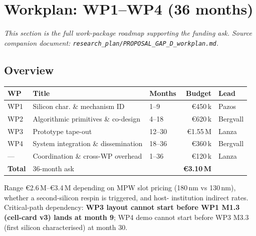 
\section{Workplan: WP1--WP4 (36 months)}
\label{sec:workplan}

\emph{This section is the full work-package roadmap supporting the
funding ask. Source companion document:
\texttt{research\_plan/PROPOSAL\_GAP\_D\_workplan.md}.}

\subsection*{Overview}

\begin{tabular}{@{}lllrl@{}}
\hline
\textbf{WP} & \textbf{Title} & \textbf{Months} & \textbf{Budget} & \textbf{Lead} \\
\hline
WP1 & Silicon char. \& mechanism ID & 1--9 & \euro 450\,k & Pazos \\
WP2 & Algorithmic primitives \& co-design & 4--18 & \euro 620\,k & Bergvall \\
WP3 & Prototype tape-out & 12--30 & \euro 1.55\,M & Lanza \\
WP4 & System integration \& dissemination & 18--36 & \euro 360\,k & Bergvall \\
--- & Coordination \& cross-WP overhead & 1--36 & \euro 120\,k & Lanza \\
\hline
\textbf{Total} & 36-month ask & & \textbf{\euro 3.10\,M} & \\
\hline
\end{tabular}

\vspace{4pt}
Range \euro 2.6\,M--\euro 3.4\,M depending on MPW slot pricing (180\,nm
vs 130\,nm), whether a second-silicon respin is triggered, and host-
institution indirect rates. Critical-path dependency: \textbf{WP3 layout
cannot start before WP1 M1.3 (cell-card v3) lands at month 9}; WP4
demo cannot start before WP3 M3.3 (first silicon characterised) at
month 30.

